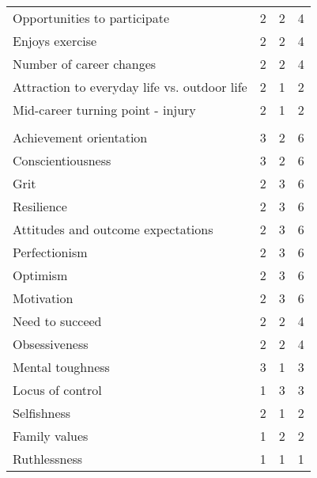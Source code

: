 \documentclass[
  12pt,
  a4paper,
]{book}
\begin{document}
\begin{table}
\begin{tabular}[t]{lrrr}
\hspace{1em}Opportunities to participate & 2 & 2 & 4\\
\hspace{1em}Enjoys exercise & 2 & 2 & 4\\
\hspace{1em}Number of career changes & 2 & 2 & 4\\
\hspace{1em}Attraction to everyday life vs. outdoor life & 2 & 1 & 2\\
\hspace{1em}Mid-career turning point - injury & 2 & 1 & 2\\
\addlinespace[0.3em]
\multicolumn{4}{l}{\textbf{Candidate personal characteristics}}\\
\hspace{1em}Achievement orientation & 3 & 2 & 6\\
\hspace{1em}Conscientiousness & 3 & 2 & 6\\
\hspace{1em}Grit & 2 & 3 & 6\\
\hspace{1em}Resilience & 2 & 3 & 6\\
\hspace{1em}Attitudes and outcome expectations & 2 & 3 & 6\\
\hspace{1em}Perfectionism & 2 & 3 & 6\\
\hspace{1em}Optimism & 2 & 3 & 6\\
\hspace{1em}Motivation & 2 & 3 & 6\\
\hspace{1em}Need to succeed & 2 & 2 & 4\\
\hspace{1em}Obsessiveness & 2 & 2 & 4\\
\hspace{1em}Mental toughness & 3 & 1 & 3\\
\hspace{1em}Locus of control & 1 & 3 & 3\\
\hspace{1em}Selfishness & 2 & 1 & 2\\
\hspace{1em}Family values & 1 & 2 & 2\\
\hspace{1em}Ruthlessness & 1 & 1 & 1\\

\end{tabular}
\end{table}
\end{document}
